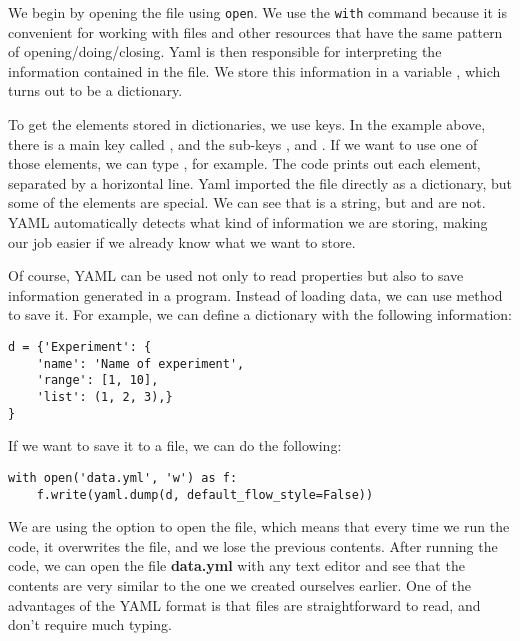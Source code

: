 We begin by opening the file using \texttt{open}. We use the \texttt{with} command because it is convenient for working with files and other resources that have the same pattern of opening/doing/closing. Yaml is then responsible for interpreting the information contained in the file. We store this information in a variable , which turns out to be a dictionary.

To get the elements stored in dictionaries, we use keys. In the example above, there is a main key called , and the sub-keys ,  and . If we want to use one of those elements, we can type , for example. The code prints out each element, separated by a horizontal line. Yaml imported the file directly as a dictionary, but some of the elements are special. We can see that  is a string, but  and  are not. {YAML} automatically detects what kind of information we are storing, making our job easier if we already know what we want to store.



Of course, YAML can be used not only to read properties but also to save information generated in a program. Instead of loading data, we can use  method to save it. For example, we can define a dictionary with the following information:

\begin{verbatim}
d = {'Experiment': {
    'name': 'Name of experiment',
    'range': [1, 10],
    'list': (1, 2, 3),}
}
\end{verbatim}

If we want to save it to a file, we can do the following:

\begin{verbatim}
with open('data.yml', 'w') as f:
    f.write(yaml.dump(d, default_flow_style=False))
\end{verbatim}

We are using the  option to open the file, which means that every time we run the code, it overwrites the file, and we lose the previous contents. After running the code, we can open the file \textbf{data.yml} with any text editor and see that the contents are very similar to the one we created ourselves earlier. One of the advantages of the YAML format is that files are straightforward to read, and don't require much typing.

